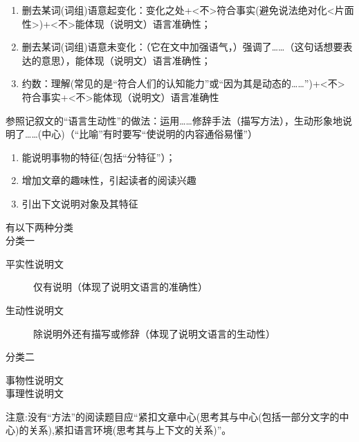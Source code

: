 \begin{enumerate}
\item 删去某词(词组)语意起变化：变化之处+<不>符合事实(避免说法绝对化<片面性>)+<不>能体现（说明文）语言准确性；
\item 删去某词(词组)语意未变化：（它在文中加强语气，）强调了\ldots{}\ldots{}（这句话想要表达的意思），能体现（说明文）语言准确性；
\item 约数：理解(常见的是``符合人们的认知能力''或``因为其是动态的\ldots{}\ldots{}'')+<不>符合事实+<不>能体现（说明文）语言准确性
\end{enumerate}
参照记叙文的``语言生动性''的做法：运用\ldots{}\ldots{}修辞手法（描写方法），生动形象地说明了\ldots{}\ldots{}(中心)（``比喻''有时要写``使说明的内容通俗易懂''）
\begin{enumerate}
\item 能说明事物的特征(包括``分特征''）；
\item 增加文章的趣味性，引起读者的阅读兴趣
\item 引出下文说明对象及其特征
\end{enumerate}

有以下两种分类
\\分类一
\begin{description}
\item[平实性说明文]仅有说明（体现了说明文语言的准确性）
\item[生动性说明文]除说明外还有描写或修辞（体现了说明文语言的生动性）
\end{description}
分类二
\begin{description}
\item[事物性说明文]
\item[事理性说明文]
\end{description}

注意:没有``方法''的阅读题目应``紧扣文章中心(思考其与中心(包括一部分文字的中心)的关系),紧扣语言环境(思考其与上下文的关系)''。
\label{main} 